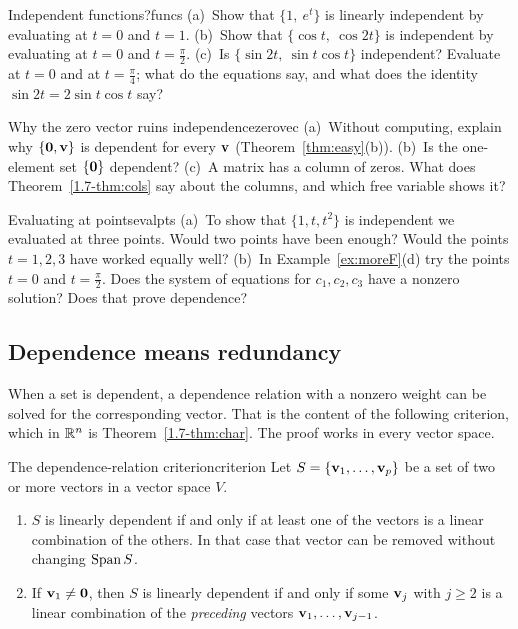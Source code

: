 \documentclass[11pt]{article}
\begin{document}
\begin{kc}{Independent functions?}{funcs}
(a)~Show that $\{1,\ e^t\}$ is linearly independent by evaluating at $t=0$ and $t=1$. (b)~Show that $\{\cos t,\ \cos2t\}$ is independent by evaluating at $t=0$ and $t=\tfrac{\pi}{2}$. (c)~Is $\{\sin2t,\ \sin t\cos t\}$ independent? Evaluate at $t=0$ and at $t=\tfrac{\pi}{4}$; what do the equations say, and what does the identity $\sin2t=2\sin t\cos t$ say?
\end{kc}

\begin{think}{Why the zero vector ruins independence}{zerovec}
(a)~Without computing, explain why $\{\mathbf{0},\mathbf{v}\}$ is dependent for every $\mathbf{v}$ (Theorem~\ref{thm:easy}(b)). (b)~Is the one-element set $\{\mathbf{0}\}$ dependent? (c)~A matrix has a column of zeros. What does Theorem~\ref{1.7-thm:cols} say about the columns, and which free variable shows it?
\end{think}

\begin{think}{Evaluating at points}{evalpts}
(a)~To show that $\{1,t,t^2\}$ is independent we evaluated at three points. Would two points have been enough? Would the points $t=1,2,3$ have worked equally well? (b)~In Example~\ref{ex:moreF}(d) try the points $t=0$ and $t=\tfrac{\pi}{2}$. Does the system of equations for $c_1,c_2,c_3$ have a nonzero solution? Does that prove dependence?
\end{think}

\subsection*{Dependence means redundancy}

When a set is dependent, a dependence relation with a nonzero weight can be solved for the corresponding vector. That is the content of the following criterion, which in $\mathbb{R}^n$ is Theorem~\ref{1.7-thm:char}. The proof works in every vector space.

\begin{thm}{The dependence-relation criterion}{criterion}
Let $S=\{\mathbf{v}_1,\dots,\mathbf{v}_p\}$ be a set of two or more vectors in a vector space $V$.
\begin{enumerate}[label=(\alph*),itemsep=1pt]
  \item $S$ is linearly dependent if and only if at least one of the vectors is a linear combination of the others. In that case that vector can be removed without changing $\operatorname{Span} S$.
  \item If $\mathbf{v}_1\neq\mathbf{0}$, then $S$ is linearly dependent if and only if some $\mathbf{v}_j$ with $j\ge2$ is a linear combination of the \emph{preceding} vectors $\mathbf{v}_1,\dots,\mathbf{v}_{j-1}$.
\end{enumerate}
\end{thm}
\end{document}
